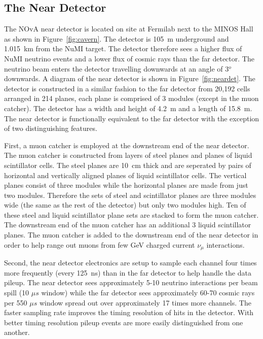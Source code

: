 \subsection{The Near Detector}\label{sec:neardet}

The NOvA near detector is located on site at Fermilab next to the
MINOS Hall as shown in Figure~\ref{fig:cavern}. The detector is 105~m
underground and 1.015~km from the NuMI target. The detector therefore
sees a higher flux of NuMI neutrino events and a lower flux of cosmic
rays than the far detector.
The neutrino beam enters the detector travelling downwards at an angle
of 3$^o$ downwards. 
A diagram of the near detector is shown in Figure~\ref{fig:neardet}.
The detector is constructed in a similar fashion to the far detector
from 20,192 cells arranged in 214 planes, each plane is comprised of 3
modules (except in the muon catcher). The detector has a width and
height of 4.2~m and a length of 15.8~m. The near detector is
functionally equivalent to the far detector with the exception of two
distinguishing features.

First, a muon catcher is employed at the downstream end of the near
detector. 
The muon catcher is constructed from layers of steel planes and
planes of liquid scintillator cells. The steel planes are 10~cm
thick and are seperated by pairs of horizontal and vertically aligned
planes of liquid scintillator cells. The vertical planes consist of
three modules while the horizontal planes are made from just two
modules. Therefore the sets of steel and scintillator planes are
three modules wide (the same as the rest of the detector) but only
two modules high. Ten of these steel and
liquid scintillator plane sets are stacked to form the muon
catcher. The downstream end of the muon catcher has an additional 3
liquid scintillator planes. The muon catcher is added to the
downstream end of the near detector in order to help range out muons
from few GeV charged current $\nu_{\mu}$ interactions.

Second, the near detector electronics are setup to sample each channel
four times more frequently (every 125~ns) than in the far 
detector to help handle the data pileup. 
The near detector sees approximately 5-10 neutrino interactions per
beam spill (10 $\mu s$ window) while the far detector sees
approximately 60-70 cosmic rays per 550 $\mu s$ window spread out over
approximately 17 times more channels. The faster sampling rate
improves the timing resolution of hits in the detector. With better
timing resolution pileup events are more easily distinguished from one
another. 




